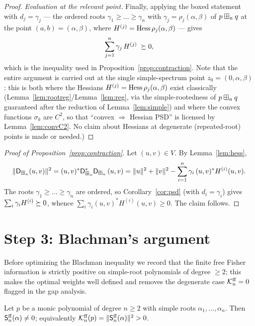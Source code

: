 \begin{proof}
\smallskip\noindent\textit{Evaluation at the relevant point.}
Finally, applying the boxed statement with $d_j=\gamma_j$ — the ordered roots
$\gamma_1\ge\dots\ge\gamma_n$ with $\gamma_j=\rho_j(\alpha,\beta)$ of $p\boxplus_n q$ at the point
$(a,b)=(\alpha,\beta)$, where $H^{(j)}=\operatorname{Hess}\rho_j(\alpha,\beta)$ — gives
\[
\sum_{j=1}^n \gamma_j\,H^{(j)}\;\succeq 0,
\]
which is the inequality used in Proposition~\ref{prop:contraction}. Note that the
entire argument is carried out at the single simple-spectrum point
$z_0=(0,\alpha,\beta)$: this is both where the Hessians $H^{(j)}=\operatorname{Hess}\rho_j(\alpha,\beta)$
exist classically (Lemma~\ref{lem:rootreg}/Lemma~\ref{lem:reg}, via the
simple-rootedness of $p\boxplus_n q$ guaranteed after the reduction of
Lemma~\ref{lem:simple}) and where the convex functions $\sigma_k$ are $C^2$, so
that ``convex $\Rightarrow$ Hessian PSD'' is licensed by Lemma~\ref{lem:convC2}.
No claim about Hessians at degenerate (repeated-root) points is made or needed.)
\end{proof}

\begin{proof}[Proof of Proposition~\ref{prop:contraction}]
Let $(u,v)\in V$. By Lemma~\ref{lem:hess},
\[
\|\mathsf{D}_{\boxplus_n}(u,v)\|^2=(u,v)^\ast \mathsf{D}_{\boxplus_n}^\ast\mathsf{D}_{\boxplus_n}\,(u,v)
=\|u\|^2+\|v\|^2-\sum_{i=1}^n\gamma_i\,(u,v)^\ast H^{(i)}(u,v).
\]
The roots $\gamma_1\ge\dots\ge\gamma_n$ are ordered, so
Corollary~\ref{cor:psd} (with $d_i=\gamma_i$) gives $\sum_i\gamma_i H^{(i)}\succeq 0$,
whence $\sum_i\gamma_i(u,v)^\ast H^{(i)}(u,v)\ge0$. The claim follows.
\end{proof}

\section*{Step 3: Blachman's argument}

Before optimizing the Blachman inequality we record that the finite free Fisher
information is strictly positive on simple-root polynomials of degree $\ge2$; this
makes the optimal weights well defined and removes the degenerate case
$\mathcal{K}^{\mathrm{ff}}_n=0$ flagged in the gap analysis.

\begin{qfourlemma}\label{lem:positive}
Let $p$ be a monic polynomial of degree $n\ge2$ with simple roots
$\alpha_1,\dots,\alpha_n$. Then $\mathsf{S}^{\mathrm{ff}}_n(\alpha)\ne0$; equivalently
$\mathcal{K}^{\mathrm{ff}}_n(p)=\|\mathsf{S}^{\mathrm{ff}}_n(\alpha)\|^2>0$.
\end{qfourlemma}

